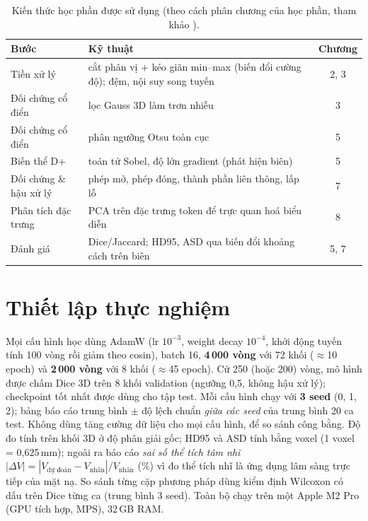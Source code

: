 \documentclass[11pt,a4paper]{article}
\begin{document}
\begin{table}[t]
\centering\small
\caption{Kiến thức học phần được sử dụng (theo cách phân chương của học phần, tham khảo \cite{gonzalez}).}
\label{tab:chapters}
\begin{tabularx}{\linewidth}{lXc}
\toprule
Bước & Kỹ thuật & Chương\\
\midrule
Tiền xử lý & cắt phân vị + kéo giãn min--max (biến đổi cường độ); đệm, nội suy song tuyến & 2, 3\\
Đối chứng cổ điển & lọc Gauss 3D làm trơn nhiễu & 3\\
Đối chứng cổ điển & phân ngưỡng Otsu toàn cục \cite{otsu} & 5\\
Biến thể D+ & toán tử Sobel, độ lớn gradient (phát hiện biên) & 5\\
Đối chứng \& hậu xử lý & phép mở, phép đóng, thành phần liên thông, lấp lỗ & 7\\
Phân tích đặc trưng & PCA trên đặc trưng token để trực quan hoá biểu diễn & 8\\
Đánh giá & Dice/Jaccard; HD95, ASD qua biến đổi khoảng cách trên biên & 5, 7\\
\bottomrule
\end{tabularx}
\end{table}

\section{Thiết lập thực nghiệm}
Mọi cấu hình học dùng AdamW (lr $10^{-3}$, weight decay $10^{-4}$, khởi động tuyến tính 100 vòng rồi giảm theo cosin), batch 16, \textbf{4\,000 vòng} với 72 khối ($\approx$10 epoch) và \textbf{2\,000 vòng} với 8 khối ($\approx$45 epoch). Cứ 250 (hoặc 200) vòng, mô hình được chấm Dice 3D trên 8 khối validation (ngưỡng 0,5, không hậu xử lý); checkpoint tốt nhất được dùng cho tập test. Mỗi cấu hình chạy với \textbf{3 seed} (0, 1, 2); bảng báo cáo trung bình $\pm$ độ lệch chuẩn \emph{giữa các seed} của trung bình 20 ca test. Không dùng tăng cường dữ liệu cho mọi cấu hình, để so sánh công bằng. Độ đo tính trên khối 3D ở độ phân giải gốc; HD95 và ASD tính bằng voxel (1 voxel = 0,625\,mm); ngoài ra báo cáo \emph{sai số thể tích tâm nhĩ} $|\Delta V|=|V_{\text{dự đoán}}-V_{\text{nhãn}}|/V_{\text{nhãn}}$ (\%) vì đo thể tích nhĩ là ứng dụng lâm sàng trực tiếp của mặt nạ. So sánh từng cặp phương pháp dùng kiểm định Wilcoxon có dấu trên Dice từng ca (trung bình 3 seed). Toàn bộ chạy trên một Apple M2 Pro (GPU tích hợp, MPS), 32\,GB RAM.
\end{document}
